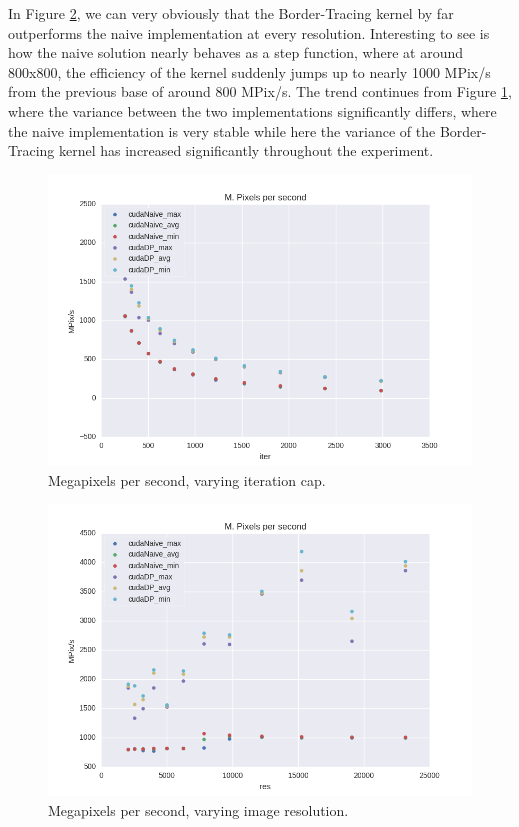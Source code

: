 \documentclass[letterpaper]{article}
\begin{document}
\begin{multicols}{2}
In Figure \ref{fig:mppsRes}, we can very obviously that the Border-Tracing
  kernel by far outperforms the naive implementation at every resolution.
  Interesting to see is how the naive solution nearly behaves as a step
  function, where at around 800x800, the efficiency of the kernel suddenly jumps
  up to nearly 1000 MPix/s from the previous base of around 800 MPix/s.
The trend continues from Figure \ref{fig:mppsIter}, where the variance between
  the two implementations significantly differs, where the naive implementation
  is very stable while here the variance of the Border-Tracing kernel has
  increased significantly throughout the experiment.

\begin{figure}[H]
  \includegraphics[width=\linewidth]{experiments3/mpps_graph_exp_iter.png}
  \caption{Megapixels per second, varying iteration cap.}
  \label{fig:mppsIter}
\end{figure}

\begin{figure}[H]
  \includegraphics[width=\linewidth]{experiments3/mpps_graph_exp_res.png}
  \caption{Megapixels per second, varying image resolution.}
  \label{fig:mppsRes}
\end{figure}




\end{multicols}
\end{document}
